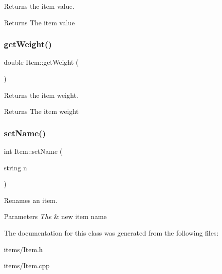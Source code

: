 Returns the item value. 

\begin{DoxyReturn}{Returns}
The item value 
\end{DoxyReturn}
\mbox{\label{class_item_ada983fd5602c02f2ec2bc86401b2355e}} 
\subsubsection{\texorpdfstring{getWeight()}{getWeight()}}
{\footnotesize\ttfamily double Item\+::get\+Weight (\begin{DoxyParamCaption}{ }\end{DoxyParamCaption})}



Returns the item weight. 

\begin{DoxyReturn}{Returns}
The item weight 
\end{DoxyReturn}
\mbox{\label{class_item_ae953e703d38c89ab573201c3869b1c2b}} 
\subsubsection{\texorpdfstring{setName()}{setName()}}
{\footnotesize\ttfamily int Item\+::set\+Name (\begin{DoxyParamCaption}\item[{string}]{n }\end{DoxyParamCaption})}



Renames an item. 


\begin{DoxyParams}{Parameters}
{\em The} & new item name \\
\hline
\end{DoxyParams}


The documentation for this class was generated from the following files\+:\begin{DoxyCompactItemize}
\item 
items/Item.\+h\item 
items/Item.\+cpp\end{DoxyCompactItemize}

